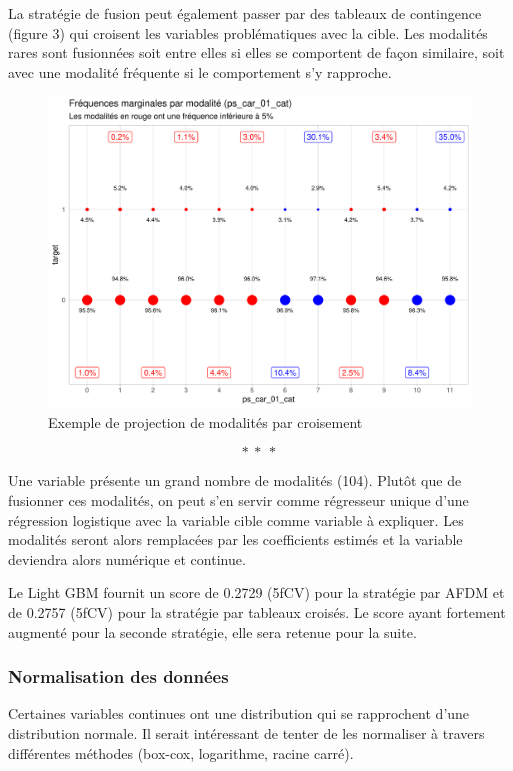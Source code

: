 \documentclass[french]{article}
\begin{document}
\begin{multicols}{2}
La stratégie de fusion peut également passer par des tableaux de contingence (figure 3) qui croisent les variables problématiques avec la cible. Les modalités rares sont fusionnées soit entre elles si elles se comportent de façon similaire, soit avec une modalité fréquente si le comportement s'y rapproche.

\begin{figure}[H] \centering
  \includegraphics[width = \columnwidth]{img/ex_tabc}
  \caption{Exemple de projection de modalités par croisement}
\end{figure}

\[ * \ * \ * \]

Une variable présente un grand nombre de modalités (104). Plutôt que de fusionner ces modalités, on peut s'en servir comme régresseur unique d'une régression logistique avec la variable cible comme variable à expliquer. Les modalités seront alors remplacées par les coefficients estimés et la variable deviendra alors numérique et continue.

Le Light GBM fournit un score de 0.2729 (5fCV) pour la stratégie par AFDM et de 0.2757 (5fCV) pour la stratégie par tableaux croisés. Le score ayant fortement augmenté pour la seconde stratégie, elle sera retenue pour la suite.

\subsubsection{Normalisation des données}

Certaines variables continues ont une distribution qui se rapprochent d'une distribution normale. Il serait intéressant de tenter de les normaliser à travers différentes méthodes (box-cox, logarithme, racine carré).


\end{multicols}
\end{document}
